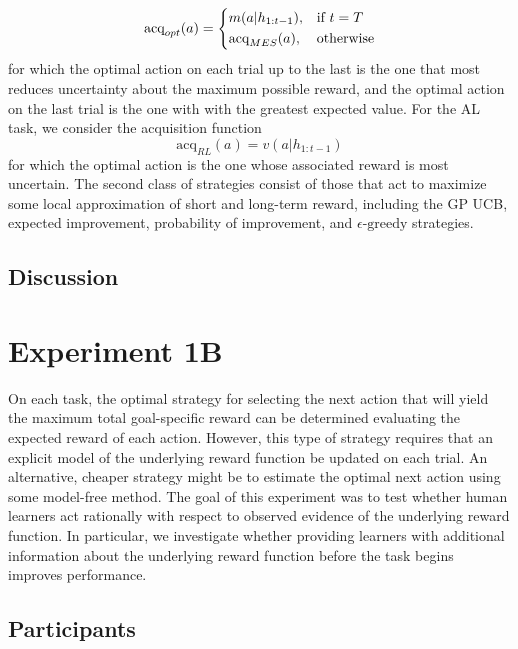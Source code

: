 \documentclass[10pt,letterpaper]{article}
\begin{document}
	\begin{equation}
	\text{acq}_{opt}(a) = 
	\begin{dcases}
	m(a|h_{1:t-1}), & \text{if } t = T\\
	\text{acq}_{MES}(a), & \text{otherwise}
	\end{dcases}
	\end{equation}
	for which the optimal action on each trial up to the last is the one that most reduces uncertainty about the maximum possible reward, and the optimal action on the last trial is the one with with the greatest expected value. For the AL task, we consider the acquisition function
	\begin{equation}
	\text{acq}_{RL}(a)  = v(a|h_{1:t-1})
	\end{equation}
	for which the optimal action is the one whose associated reward is most uncertain. The second class of strategies consist of those that act to maximize some local approximation of short and long-term reward, including the GP UCB, expected improvement, probability of improvement, and $\epsilon \text{-greedy}$ strategies.
	
	\subsection{Discussion}
	
	\section{Experiment 1B}
	
	On each task, the optimal strategy for selecting the next action that will yield the maximum total goal-specific reward can be determined evaluating the expected reward of each action. However, this type of strategy requires that an explicit model of the underlying reward function be updated on each trial. An alternative, cheaper strategy might be to estimate the optimal next action using some model-free method. The goal of this experiment was to test whether human learners act rationally with respect to observed evidence of the underlying reward function. In particular, we investigate whether providing learners with additional information about the underlying reward function before the task begins improves performance.
	
	\subsection{Participants}
	
\end{document}
